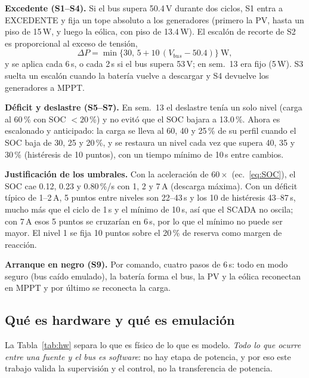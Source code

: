 \documentclass[conference]{IEEEtran}
\begin{document}
\textbf{Excedente (S1--S4).} Si el bus supera 50.4\,V durante dos ciclos, S1 entra a EXCEDENTE y fija un tope absoluto a los generadores (primero la PV, hasta un piso de 15\,W, y luego la eólica, con piso de 13.4\,W). El escalón de recorte de S2 es proporcional al exceso de tensión,
\begin{equation}
\label{eq:dP}
\Delta P=\min\{30,\,5+10\,(V_{bus}-50.4)\}\ \text{W},
\end{equation}
y se aplica cada 6\,s, o cada 2\,s si el bus supera 53\,V; en sem.~13 era fijo (5\,W). S3 suelta un escalón cuando la batería vuelve a descargar y S4 devuelve los generadores a MPPT.

\textbf{Déficit y deslastre (S5--S7).} En sem.~13 el deslastre tenía un solo nivel (carga al 60\,\% con SOC $<20$\,\%) y no evitó que el SOC bajara a 13.0\,\%. Ahora es escalonado y anticipado: la carga se lleva al 60, 40 y 25\,\% de su perfil cuando el SOC baja de 30, 25 y 20\,\%, y se restaura un nivel cada vez que supera 40, 35 y 30\,\% (histéresis de 10 puntos), con un tiempo mínimo de 10\,s entre cambios.

\textbf{Justificación de los umbrales.} Con la aceleración de $60\times$ (ec.~\ref{eq:SOC}), el SOC cae 0.12, 0.23 y 0.80\,\%/s con 1, 2 y 7\,A (descarga máxima). Con un déficit típico de 1--2\,A, 5 puntos entre niveles son 22--43\,s y los 10 de histéresis 43--87\,s, mucho más que el ciclo de 1\,s y el mínimo de 10\,s, así que el SCADA no oscila; con 7\,A esos 5 puntos se cruzarían en 6\,s, por lo que el mínimo no puede ser mayor. El nivel 1 se fija 10 puntos sobre el 20\,\% de reserva como margen de reacción.

\textbf{Arranque en negro (S9).} Por comando, cuatro pasos de 6\,s: todo en modo seguro (bus caído emulado), la batería forma el bus, la PV y la eólica reconectan en MPPT y por último se reconecta la carga.

\subsection{Qué es hardware y qué es emulación}

La Tabla~\ref{tab:hw} separa lo que es físico de lo que es modelo. \emph{Todo lo que ocurre entre una fuente y el bus es software}: no hay etapa de potencia, y por eso este trabajo valida la supervisión y el control, no la transferencia de potencia.
\end{document}
